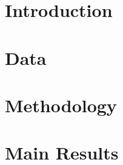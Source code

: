 \documentclass[letterpaper,12pt,final]{article}
\begin{document}
\begin{abstract}
\medskip
\noindent\textbf{Keywords:} Misclassification error, employment transitions,
EM algorithm, panel data, South Africa

\noindent\textbf{JEL Codes:} J63, C23, C41
\end{abstract}

\pagebreak
\tableofcontents
\pagebreak

\section{Introduction}\label{sec:introduction}



\section{Data}\label{sec:data}







\section{Methodology}\label{sec:methodology}



\section{Main Results}\label{sec:results}




\end{document}
